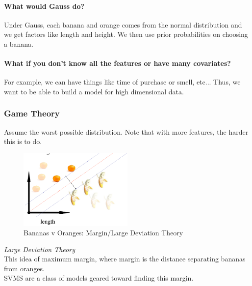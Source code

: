 \paragraph{What would Gauss do?\\} 

Under Gauss, each banana and orange comes from the normal distribution and we
get factors like length and height. We then use prior probabilities on choosing
a banana. 

\paragraph{What if you don't know all the features or have many covariates?\\}
For example, we can have things like time of purchase or smell, etc... Thus, we want to be able to build a model for high dimensional data.

\subsubsection{Game Theory}

Assume the worst possible distribution. Note that with more features, the harder this is to do.\\

\begin{figure}[ht]
  \begin{center}
    \includegraphics[width=0.5\textwidth]{figures/BananasOranges.png}
    \caption{
      Bananas v Oranges: Margin/Large Deviation Theory}
    \label{Figure 1}
  \end{center}
\end{figure}

\textit{Large Deviation Theory\\}
This idea of maximum margin, where margin is the distance separating bananas from oranges.\\

SVMS are a class of models geared toward finding this margin.

